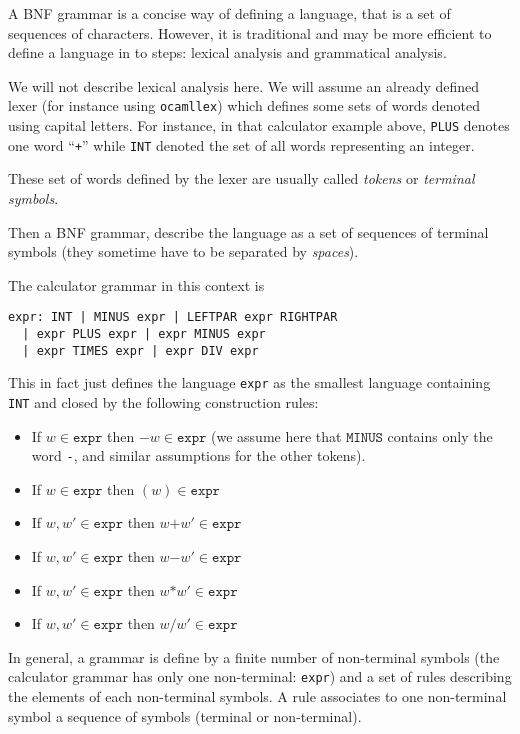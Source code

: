 \documentclass[12pt]{article}
\begin{document}
{A BNF grammar is a concise way of defining a language, that is a set of
sequences of characters. However, it is traditional and may be more efficient to define a language in to steps: lexical analysis and grammatical analysis.

We will not describe lexical analysis here. We will assume an already
defined lexer (for instance using \texttt{ocamllex}) which defines 
some sets of words denoted using capital letters. For instance, 
in that calculator example above, \verb#PLUS# denotes one word 
``\verb#+#'' while \verb#INT# denoted the set of all words representing
an integer.

These set of words defined by the lexer are usually called {\em
  tokens} or {\em terminal symbols}.

Then a BNF grammar, describe the language as a set of sequences of
terminal symbols 
(they sometime have to be separated by {\em spaces}). 

The calculator grammar in this context is 

\begin{verbatim}
expr: INT | MINUS expr | LEFTPAR expr RIGHTPAR
  | expr PLUS expr | expr MINUS expr 
  | expr TIMES expr | expr DIV expr
\end{verbatim}
 
This in fact just defines the language \texttt{expr} as the smallest language
containing \texttt{INT} and closed by the following construction
rules:
\begin{itemize}
\item If $w \in \mathtt{expr}$ then $\mathtt{-}w \in \mathtt{expr}$ (we assume
  here that $\texttt{MINUS}$ contains only the word \verb#-#, and
  similar assumptions for the other tokens).
\item If $w \in \mathtt{expr}$ then $(w) \in \mathtt{expr}$
\item If $w,w' \in \mathtt{expr}$ then $w\mathtt{+}w' \in \mathtt{expr}$
\item If $w,w' \in \mathtt{expr}$ then $w\mathtt{-}w' \in \mathtt{expr}$
\item If $w,w' \in \mathtt{expr}$ then $w\mathtt{*}w' \in \mathtt{expr}$
\item If $w,w' \in \mathtt{expr}$ then $w\mathtt{/}w' \in \mathtt{expr}$
\end{itemize}

In general, a grammar is define by a finite number of non-terminal
symbols (the calculator grammar has only one non-terminal:
\texttt{expr}) and a set of rules describing the elements of each
non-terminal symbols.  
A rule associates to one non-terminal symbol a sequence of symbols
(terminal or non-terminal). 

}
\end{document}
